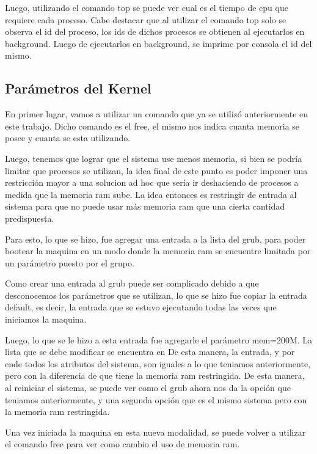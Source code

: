 \documentclass[a4paper, 12pt]{article}
\begin{document}
Luego, utilizando el comando top se puede ver cual es el tiempo de cpu que requiere cada proceso. Cabe destacar que al utilizar el comando top solo se observa el id del proceso, los ids de dichos procesos se obtienen al ejecutarlos en background. Luego de ejecutarlos en background, se imprime por consola el id del mismo.

\subsection*{Par\'ametros del Kernel}

En primer lugar, vamos a utilizar un comando que ya se utiliz\'o anteriormente en este trabajo. Dicho comando es el free, el mismo nos indica cuanta memoria se posee y cuanta se esta utilizando.

Luego, tenemos que lograr que el sistema use menos memoria, si bien se podr\'ia limitar que procesos se utilizan, la idea final de este punto es poder imponer una restricci\'on mayor a una solucion ad hoc que ser\'ia ir deshaciendo de procesos a medida que la memoria ram sube. La idea entonces es restringir de entrada al sistema para que no puede usar m\'as memoria ram que una cierta cantidad predispuesta.

Para esto, lo que se hizo, fue agregar una entrada a la lista del grub, para poder bootear la maquina en un modo donde la memoria ram se encuentre limitada por un par\'ametro puesto por el grupo.

Como crear una entrada al grub puede ser complicado debido a que desconocemos los par\'ametros que se utilizan, lo que se hizo fue copiar la entrada default, es decir, la entrada que se estuvo ejecutando todas las veces que iniciamos la maquina. 

Luego, lo que se le hizo a esta entrada fue agregarle el par\'ametro mem=200M. La lista que se debe modificar se encuentra en  De esta manera, la entrada, y por ende todos los atributos del sistema, son iguales a lo que teniamos anteriormente, pero con la diferencia de que tiene la memoria ram restringida. De esta manera, al reiniciar el sistema, se puede ver como el grub ahora nos da la opci\'on que teniamos anteriormente, y una segunda opci\'on que es el mismo sistema pero con la memoria ram restringida. 

Una vez iniciada la maquina en esta nueva modalidad, se puede volver a utilizar el comando free para ver como cambio el uso de memoria ram.
\end{document}
